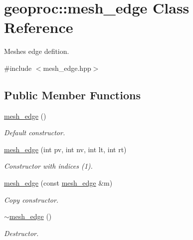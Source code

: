 \hypertarget{classgeoproc_1_1mesh__edge}{}\section{geoproc\+:\+:mesh\+\_\+edge Class Reference}
\label{classgeoproc_1_1mesh__edge}


Meshe\textquotesingle{}s edge defition.  




{\ttfamily \#include $<$mesh\+\_\+edge.\+hpp$>$}

\subsection*{Public Member Functions}
\begin{DoxyCompactItemize}
\item 
\mbox{\label{classgeoproc_1_1mesh__edge_ab54d5cca1a94addee7c591bd8a7e553b}} 
\hyperlink{classgeoproc_1_1mesh__edge_ab54d5cca1a94addee7c591bd8a7e553b}{mesh\+\_\+edge} ()
\begin{DoxyCompactList}\small\item\em Default constructor. \end{DoxyCompactList}\item 
\mbox{\label{classgeoproc_1_1mesh__edge_a67841c3983cd67cf346bf23cb15411bf}} 
\hyperlink{classgeoproc_1_1mesh__edge_a67841c3983cd67cf346bf23cb15411bf}{mesh\+\_\+edge} (int pv, int nv, int lt, int rt)
\begin{DoxyCompactList}\small\item\em Constructor with indices (1). \end{DoxyCompactList}\item 
\mbox{\label{classgeoproc_1_1mesh__edge_adcd094f91449248c574402dff022b94f}} 
\hyperlink{classgeoproc_1_1mesh__edge_adcd094f91449248c574402dff022b94f}{mesh\+\_\+edge} (const \hyperlink{classgeoproc_1_1mesh__edge}{mesh\+\_\+edge} \&m)
\begin{DoxyCompactList}\small\item\em Copy constructor. \end{DoxyCompactList}\item 
\mbox{\label{classgeoproc_1_1mesh__edge_adef0206bd416bf736b17ba6bf136b3ea}} 
\hyperlink{classgeoproc_1_1mesh__edge_adef0206bd416bf736b17ba6bf136b3ea}{$\sim$mesh\+\_\+edge} ()
\begin{DoxyCompactList}\small\item\em Destructor. \end{DoxyCompactList}\end{DoxyCompactItemize}
